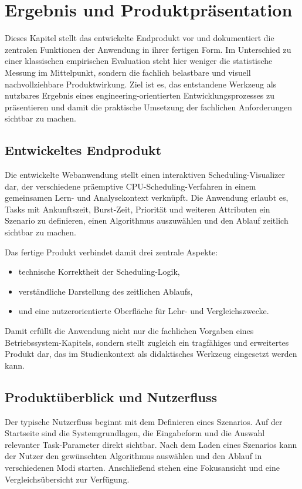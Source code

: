 \chapter{Ergebnis und Produktpräsentation}

Dieses Kapitel stellt das entwickelte Endprodukt vor und dokumentiert die zentralen Funktionen der Anwendung in ihrer fertigen Form. Im Unterschied zu einer klassischen empirischen Evaluation steht hier weniger die statistische Messung im Mittelpunkt, sondern die fachlich belastbare und visuell nachvollziehbare Produktwirkung. Ziel ist es, das entstandene Werkzeug als nutzbares Ergebnis eines engineering-orientierten Entwicklungsprozesses zu präsentieren und damit die praktische Umsetzung der fachlichen Anforderungen sichtbar zu machen.

\section{Entwickeltes Endprodukt}

Die entwickelte Webanwendung stellt einen interaktiven Scheduling-Visualizer dar, der verschiedene präemptive CPU-Scheduling-Verfahren in einem gemeinsamen Lern- und Analysekontext verknüpft. Die Anwendung erlaubt es, Tasks mit Ankunftszeit, Burst-Zeit, Priorität und weiteren Attributen ein Szenario zu definieren, einen Algorithmus auszuwählen und den Ablauf zeitlich sichtbar zu machen.

Das fertige Produkt verbindet damit drei zentrale Aspekte:

\begin{itemize}
    \item technische Korrektheit der Scheduling-Logik,
    \item verständliche Darstellung des zeitlichen Ablaufs,
    \item und eine nutzerorientierte Oberfläche für Lehr- und Vergleichszwecke.
\end{itemize}

Damit erfüllt die Anwendung nicht nur die fachlichen Vorgaben eines Betriebssystem-Kapitels, sondern stellt zugleich ein tragfähiges und erweitertes Produkt dar, das im Studienkontext als didaktisches Werkzeug eingesetzt werden kann.

\section{Produktüberblick und Nutzerfluss}

Der typische Nutzerfluss beginnt mit dem Definieren eines Szenarios. Auf der Startseite sind die Systemgrundlagen, die Eingabeform und die Auswahl relevanter Task-Parameter direkt sichtbar. Nach dem Laden eines Szenarios kann der Nutzer den gewünschten Algorithmus auswählen und den Ablauf in verschiedenen Modi starten. Anschließend stehen eine Fokusansicht und eine Vergleichsübersicht zur Verfügung.

